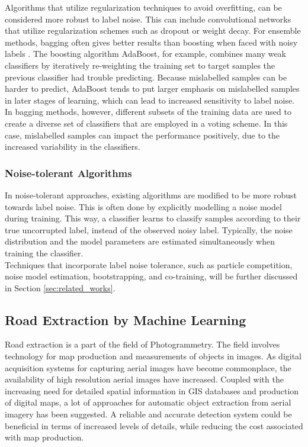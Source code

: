  Algorithms that utilize regularization techniques to avoid overfitting, can be considered more robust to label noise. This can include convolutional networks that utilize regularization schemes such as dropout or weight decay. For ensemble methods, bagging often gives better results than boosting when faced with noisy labels \citep{Dietterich_boosting_bagging}. The boosting algorithm AdaBoost, for example, combines many weak classifiers by iteratively re-weighting the training set to target samples the previous classifier had trouble predicting. Because mislabelled samples can be harder to predict, AdaBoost tends to put larger emphasis on mislabelled samples in later stages of learning, which can lead to increased sensitivity to label noise. In bagging methods, however, different subsets of the training data are used to create a diverse set of classifiers that are employed in a voting scheme. In this case, mislabelled samples can impact the performance positively, due to the increased variability in the classifiers.   


\subsubsection{Noise-tolerant Algorithms}
In noise-tolerant approaches, existing algorithms are modified to be more robust towards label noise. This is often done by explicitly modelling a noise model during training. This way, a classifier learns to classify samples according to their true uncorrupted label, instead of the observed noisy label. Typically, the noise distribution and the model parameters are estimated simultaneously when training the classifier. \\

Techniques that incorporate label noise tolerance, such as particle competition, noise model estimation, bootstrapping, and co-training, will be further discussed in Section \ref{sec:related_works}.

\subsection{Road Extraction by Machine Learning}
Road extraction is a part of the field of Photogrammetry. The field involves technology for map production and measurements of objects in images. As digital acquisition systems for capturing aerial images have become commonplace, the availability of high resolution aerial images have increased. Coupled with the increasing need for detailed spatial information in \ac{GIS} databases and production of digital maps, a lot of approaches for automatic object extraction from aerial imagery has been suggested. A reliable and accurate detection system could be beneficial in terms of increased levels of details, while reducing the cost associated with map production.\\

